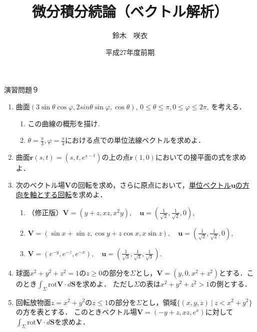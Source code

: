 \documentclass{jarticle}
\begin{document}
\title{微分積分続論（ベクトル解析）} 
\author{鈴木　咲衣}
\date{平成27年度前期}
\maketitle

\begin{center} {\Large 演習問題９ } \end{center}
\begin{enumerate}
\item \cite[章末問題2.9]{koba}
曲面$(3 \sin \theta \cos \varphi, 2sin \theta \sin \varphi, \cos \theta )$, $0\leq \theta \leq \pi, 0\leq \varphi \leq 2\pi$, を考える．
\begin{enumerate}
\item この曲線の概形を描け.
\item $\theta=\frac{\pi}{3}, \varphi=\frac{\pi}{4}$における点での単位法線ベクトルを求めよ．
\end{enumerate} 
\item \cite[問題2.48]{koba} 
曲面$\bm r(s,t)=(s,t, e^{s-t})$の上の点$\bm r(1,0)$においての接平面の式を求めよ．
\item \cite[問題7.12]{koba} 
次のベクトル場$\bm V$の回転を求め，さらに原点において，\underline{単位ベクトル$\bm u$の方向を軸とする回転}を求めよ．
\begin{enumerate}
\item （修正版）$\bm V=(y+z, xz, x^{2}y), \quad \bm u=(\frac{1}{\sqrt {2}}, \frac{1}{\sqrt {2}}, 0)$,
\item$\bm V=(\sin x+\sin z, \cos y+z\cos x, x\sin z), \quad \bm u=(\frac{1}{\sqrt {2}}, \frac{1}{\sqrt {2}}, 0)$,
\item $\bm V=(e^{-y}, e^{-z}, e^{-x}), \quad \bm u=(\frac{1}{\sqrt {3}}, \frac{1}{\sqrt {3}}, \frac{1}{\sqrt {3}})$.
\end{enumerate} 

\item \cite[問題8.16]{koba} 
球面$x^{2}+y^{2}+z^{2}=1$の$z\geq 0$の部分を$\Sigma$とし，$\bm V=(y, 0, x^{2}+z^{2})$とする．このとき$\int_{\Sigma}\mathrm{rot} \bm V \cdot d\bm S$を求めよ．
ただし$\Sigma$の表は$x^{2}+y^{2}+z^{2}>1$の側とする．
\item \cite[章末問題8.9]{koba} 
回転放物面$z=x^{2}+y^{2}$の$z\leq 1$の部分を$\Sigma$とし，領域$\{(x,y,z) \ | \ z<  x^{2}+y^{2}\}$の方を表とする．
このときベクトル場$\bm V=(-y+z, xz, e^{x})$に対して$\int_{\Sigma} \mathrm{rot} \bm V \cdot d\bm S$を求めよ．
\end{enumerate}
\newpage
\end{document}
